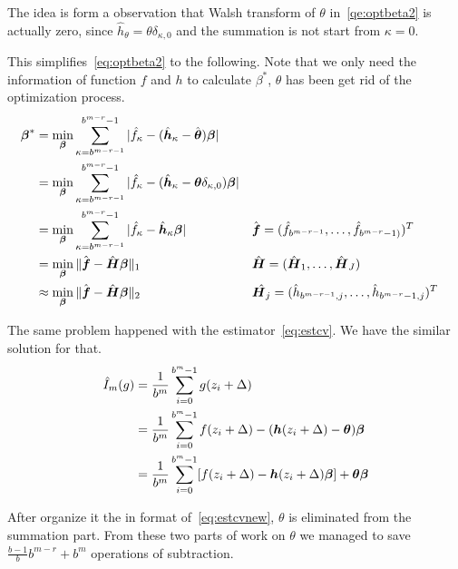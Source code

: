 The idea is form a observation that Walsh transform of $\theta$ in~\eqref{qe:optbeta2} is actually zero, since $\hat{h}_\theta= \theta\delta_{\kappa,0}$ and the summation is not start from $\kappa=0$.

This simplifies~\eqref{eq:optbeta2} to the following. Note that we only need the information of function $f$ and $h$ to calculate $\beta^*$, $\theta$ has been get rid of the optimization process.
\begin{align}
    \boldsymbol{\beta}^*
    \label{eq:optbetanew}
    &=\min_{\boldsymbol{\beta}}\sum_{\kappa=b^{m-r-1}}^{b^{m-r}-1}|\hat{f}_\kappa
    -(\hat{\boldsymbol{h}}_\kappa - \hat{\boldsymbol{\theta}})\boldsymbol{\boldsymbol{\beta}}|\\
    &=\min_{\boldsymbol{\beta}}\sum_{\kappa=b^{m-r-1}}^{b^{m-r}-1}|\hat{f}_\kappa
    -(\hat{\boldsymbol{h}}_\kappa - \boldsymbol{\theta}\delta_{\kappa,0})\boldsymbol{\boldsymbol{\beta}}| \notag \\
    &=\min_{\boldsymbol{\beta}}\sum_{\kappa=b^{m-r-1}}^{b^{m-r}-1}|\hat{f}_\kappa
    -\hat{\boldsymbol{h}}_\kappa \boldsymbol{\boldsymbol{\beta}}|
    && \hat{\boldsymbol{f}}= (\hat{f}_{b^{m-r-1}},\dots,\hat{f}_{b^{m-r}-1)})^T \notag\\
    &=\min_{\boldsymbol{\beta}}\|\hat{\boldsymbol{f}}-\hat{\boldsymbol{H}}\boldsymbol{\beta}\|_1
    && \hat{\boldsymbol{H}}= (\hat{\boldsymbol{H}}_1, \dots, \hat{\boldsymbol{H}}_J)\notag \\
    &\approx\min_{\boldsymbol{\beta}}\|\hat{\boldsymbol{f}}-\hat{\boldsymbol{H}}\boldsymbol{\beta}\|_2
    &&\hat{\boldsymbol{H}_j}=(\hat{h}_{b^{m-r-1},j},\dots, \hat{h}_{b^{m-r}-1,j})^T \notag
\end{align}

The same problem happened with the estimator~\eqref{eq:estcv}. We have the similar solution for that.
\begin{align}
    \notag
    \hat{I}_m({g})
    & = \frac{1}{b^m}\sum_{i=0}^{b^m-1}g(z_i+\Delta)\\
    \notag
    & = \frac{1}{b^m}\sum_{i=0}^{b^m-1}f(z_i+\Delta)-(\boldsymbol{h}(z_i+\Delta)-\boldsymbol{\theta})\boldsymbol{\beta}\\
    \label{eq:estcvnew}
    & = \frac{1}{b^m}\sum_{i=0}^{b^m-1}[f(z_i+\Delta)-\boldsymbol{h}(z_i+\Delta)\boldsymbol{\beta}]+\boldsymbol{\theta}\boldsymbol{\beta}
\end{align}

After organize it the in format of~\eqref{eq:estcvnew}, $\theta$ is eliminated from the summation part. From these two parts of work on $\theta$ we managed to save $\frac{b-1}{b}b^{m-r}+b^m$ operations of subtraction.


